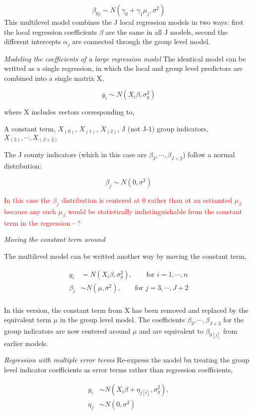 \documentclass[12pt,]{article}
\begin{document}
\[
\beta_{0j} \sim N(\gamma_0 + \gamma_1 \mu_j, \sigma^2)
\] This multilevel model combines the J local regression models in two
ways: first the local regression coefficients \(\beta\) are the same in
all J models, second the different intercepts \(\alpha_j\) are connected
through the group level model.

\textit{Modeling the coefficients of a large regression model} The
identical model can be writted as a single regression, in which the
local and group level predictors are combined into a single matrix X,

\[y_i \sim N(X_i \beta, \sigma^2_y)\]

where X includes vectors corresponding to,

A constant term, \(X_{(0)}\), \(X_{(1)}\), \(X_{(2)}\), J (not J-1)
group indicators, \(X_{(3)}, \cdots, X_{(J + 2)}\)

The J county indicators (which in this case are
\(\beta_3, \cdots, \beta_{J + 2}\)) follow a normal distribution:

\[\beta_j \sim N(0, \sigma^2)\]

\textcolor{red}{In this case the $\beta_j$ distribution is centered at 0 rather than at an estiamted $\mu_\beta$ because any such $\mu_\beta$ would be statistically indistinguishable from the constant term in the regression - ? }

\textit{Moving the constant term around}

The multilevel model can be writted another way by moving the constant
term,

\[
\begin{aligned}
y_i &= N(X_i\beta, \sigma^2_y), \qquad \text{for } i = 1, \cdots, n\\
\beta_j &\sim N(\mu, \sigma^2), \qquad \text{for } j = 3, \cdots, J + 2\\
\end{aligned}
\]

In this version, the constant term from X has been removed and replaced
by the equivalent term \(\mu\) in the group level model. The
coefficients \(\beta_3, \cdots, \beta_{J + 2}\) for the group indicators
are now centered around \(\mu\) and are equivalent to \(\beta_{0[j]}\)
from earlier models.

\textit{Regression with multiple error terms} Re-express the model bu
treating the group level indicator coefficients as error terms rather
than regression coefficients,

\[
\begin{aligned}
y_i &\sim N(X_i \beta + \eta_{j[i]}, \sigma^2_y),\\
\eta_j &\sim N(0, \sigma^2)
\end{aligned}
\]
\end{document}
